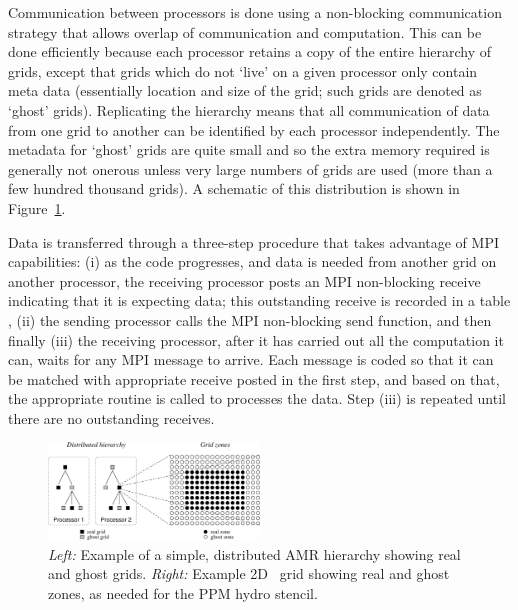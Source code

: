 Communication between processors is done using a non-blocking communication strategy that allows overlap of communication and computation.  This can be done efficiently because each processor retains a copy of the entire hierarchy of grids, except that grids which do not `live' on a given processor only contain meta data (essentially location and size of the grid; such grids are denoted as `ghost' grids).   Replicating the hierarchy means that all communication of data from one grid to another can be identified by each processor independently.  The metadata for `ghost' grids are quite small and so the extra memory required is generally not onerous unless very large numbers of grids are used (more than a few hundred thousand grids).   A schematic of this distribution is shown in Figure~\ref{fig.amr_hierarchy}.

Data is transferred through a three-step procedure that takes advantage of MPI capabilities: (i) as the code progresses, and data is needed from another grid on another processor, the receiving processor posts an MPI non-blocking receive indicating that it is expecting data; this outstanding receive is recorded in a table , (ii) the sending processor calls the MPI non-blocking send function, and then finally (iii) the receiving processor, after it has carried out all the computation it can, waits for any MPI message to arrive.  Each message is coded so that it can be matched with appropriate receive posted in the first step, and based on that, the appropriate routine is called to processes the data.  Step (iii) is repeated until there are no outstanding receives.

 

\begin{figure}
\begin{center}
\includegraphics[width=0.5\textwidth]{figures/amr_hierarchy.eps}
\end{center}
\caption{\emph{Left:}  Example of a simple, distributed AMR hierarchy showing real and ghost grids.
\emph{Right:}  Example 2D \enzo\ grid showing real and ghost zones, as 
needed for the PPM hydro stencil. }
\label{fig.amr_hierarchy}
\end{figure}



